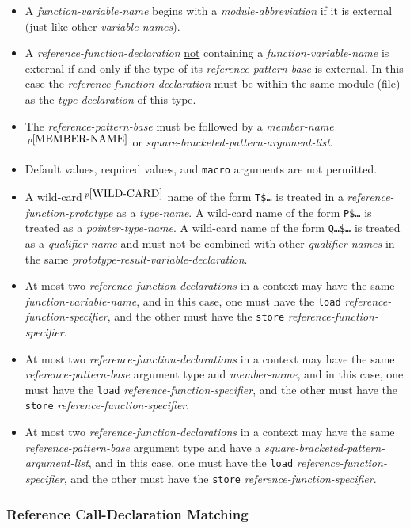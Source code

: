\documentclass[12pt]{article}
\newcommand{\pagnote}[1]{$\,^{p\pageref{#1}}$}
\begin{document}
\begin{itemize}
\item
A {\em function-variable-name} begins with a {\em module-abbreviation}
if it is external (just like other {\em variable-names}).
\item
A {\em reference-function-declaration} \underline{not} containing
a {\em function-variable-name} is external if and only if the
type of its {\em reference-pattern-base} is external.  In this case
the {\em reference-function-declaration} \underline{must} be within
the same module (file) as the {\em type-declaration} of this type.
\item
The {\em reference-pattern-base} must be
followed by
a {\em member-name}\pagnote{MEMBER-NAME} or
{\em square-bracketed-pattern-argument-list}.
\item
Default values, required values, and {\tt macro} arguments
are not permitted.
\item
A wild-card\pagnote{WILD-CARD} name of the form {\tt T\$\ldots}
is treated in a {\em reference-function-prototype} as a {\em type-name}.
A wild-card name of the form {\tt P\$\ldots} is treated as a
{\em pointer-type-name}.
A wild-card name of the form {\tt Q\ldots\$\ldots} is treated as a
{\em qualifier-name} and \underline{must not} be combined with
other {\em qualifier-names} in the same
{\em prototype-result-variable-declaration}.
\item At most two {\em reference-function-declarations} in a context
may have the same {\em function-variable-name}, and in this case,
one must have the {\tt load} {\em reference-function-specifier},
and the other must have the {\tt store}
{\em reference-function-specifier}.
\item At most two {\em reference-function-declarations} in a context
may have the same {\em reference-pattern-base} argument type and
{\em member-name}, and in this case,
one must have the {\tt load} {\em reference-function-specifier},
and the other must have the {\tt store}
{\em reference-function-specifier}.
\item At most two {\em reference-function-declarations} in a context
may have the same {\em reference-pattern-base} argument type and
have a {\em square-bracketed-pattern-argument-list}, and in this case,
one must have the {\tt load} {\em reference-function-specifier},
and the other must have the {\tt store}
{\em reference-function-specifier}.
\end{itemize}

\subsubsection{Reference Call-Declaration Matching}
\label{REFERENCE-CALL-DECLARATION-MATCHING}
\end{document}
